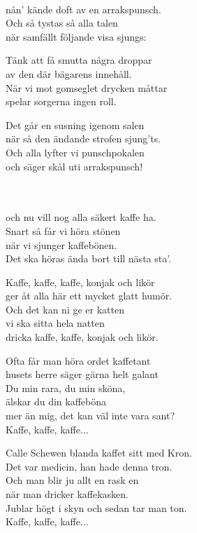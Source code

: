 \\ 
nån' kände doft av en arrakspunsch.\\ 
Och så tystas så alla talen\\ 
när samfällt följande visa sjungs:

Tänk att få smutta några droppar\\ 
av den där bägarens innehåll.\\ 
När vi mot gomseglet drycken måttar\\ 
spelar sorgerna ingen roll.

Det går en susning igenom salen\\ 
när så den ändande strofen sjung'ts.\\ 
Och alla lyfter vi punschpokalen\\ 
och säger skål uti arrakspunsch!\\


 \\       

\\  
och nu vill nog alla säkert kaffe ha.\\  
Snart så får vi höra stönen\\  
när vi sjunger kaffebönen.\\
Det ska höras ända bort till nästa sta'.

Kaffe, kaffe, kaffe, konjak och likör\\  
ger åt alla här ett mycket glatt humör.\\  
Och det kan ni ge er katten\\  
vi ska sitta hela natten\\  
dricka kaffe, kaffe, konjak och likör.

Ofta får man höra ordet kaffetant\\  
husets herre säger gärna helt galant\\  
Du min rara, du min sköna,\\  
älskar du din kaffeböna\\  
mer än mig, det kan väl inte vara sant?\\  
Kaffe, kaffe, kaffe...

Calle Schewen blanda kaffet sitt med Kron.\\  
Det var medicin, han hade denna tron.\\  
Och man blir ju allt en rask en\\  
när man dricker kaffekasken.\\  
Jublar högt i skyn och sedan tar man ton.\\  
Kaffe, kaffe, kaffe...\\  

